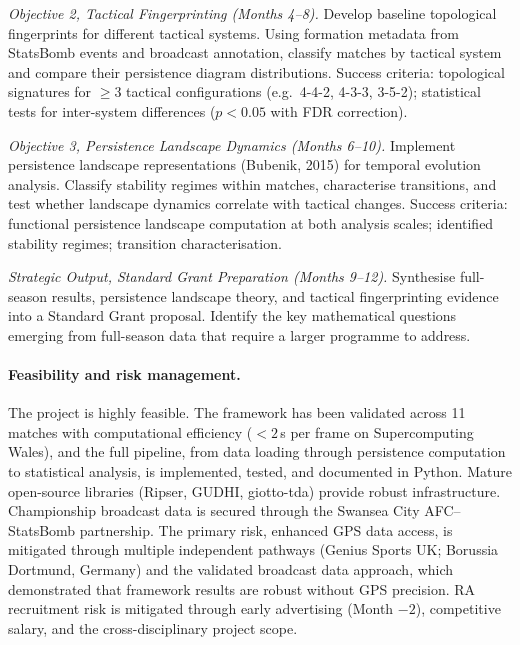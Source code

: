 \textit{Objective 2, Tactical Fingerprinting (Months 4--8).} Develop baseline topological fingerprints for different tactical systems. Using formation metadata from StatsBomb events and broadcast annotation, classify matches by tactical system and compare their persistence diagram distributions. Success criteria: topological signatures for $\geq 3$ tactical configurations (e.g.\ 4-4-2, 4-3-3, 3-5-2); statistical tests for inter-system differences ($p < 0.05$ with FDR correction).

\textit{Objective 3, Persistence Landscape Dynamics (Months 6--10).} Implement persistence landscape representations (Bubenik, 2015) for temporal evolution analysis. Classify stability regimes within matches, characterise transitions, and test whether landscape dynamics correlate with tactical changes. Success criteria: functional persistence landscape computation at both analysis scales; identified stability regimes; transition characterisation.

\textit{Strategic Output, Standard Grant Preparation (Months 9--12).} Synthesise full-season results, persistence landscape theory, and tactical fingerprinting evidence into a Standard Grant proposal. Identify the key mathematical questions emerging from full-season data that require a larger programme to address.

\paragraph{Feasibility and risk management.}
The project is highly feasible. The framework has been validated across 11 matches with computational efficiency (${<}2$\,s per frame on Supercomputing Wales), and the full pipeline, from data loading through persistence computation to statistical analysis, is implemented, tested, and documented in Python. Mature open-source libraries (Ripser, GUDHI, giotto-tda) provide robust infrastructure. Championship broadcast data is secured through the Swansea City AFC--StatsBomb partnership. The primary risk, enhanced GPS data access, is mitigated through multiple independent pathways (Genius Sports UK; Borussia Dortmund, Germany) and the validated broadcast data approach, which demonstrated that framework results are robust without GPS precision. RA recruitment risk is mitigated through early advertising (Month $-2$), competitive salary, and the cross-disciplinary project scope.

